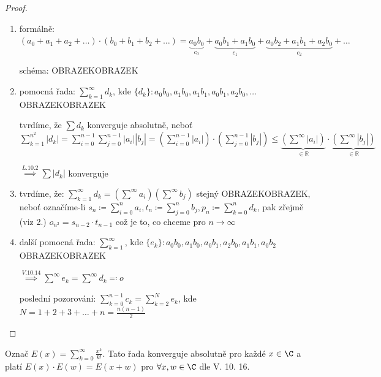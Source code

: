 \begin{proof}
   \begin{enumerate}[1.]
     \item formálně: $(a_0 + a_1 + a_2 + \dots)\cdot(b_0+b_1+b_2+\dots) = \underbrace{a_0b_0}_{c_0}+\underbrace{a_0b_1+a_1b_0}_{c_1}+\underbrace{a_0b_2+a_1b_1+a_2b_0}_{c_2}+\dots$

     schéma: OBRAZEKOBRAZEK
     \item pomocná řada: $\sum_{k=1}^{\infty} d_k$, kde $\{d_k\}: a_0b_0, a_1b_0, a_1b_1, a_0b_1, a_2b_0, \dots$ OBRAZEKOBRAZEK

     tvrdíme, že $\sum d_k$ konverguje absolutně, neboť $\sum_{k=1}^{n^2}|d_k| = \sum_{i=0}^{n-1} \sum_{j=0}^{n-1} |a_i||b_j| = \left(\sum_{i=0}^{n-1} |a_i|\right)\cdot\left(\sum_{j=0}^{n-1}|b_j|\right) \leq \underbrace{\left(\sum^{\infty} |a_i|\right)}_{\in \mathbb R}\cdot\underbrace{\left(\sum^{\infty}|b_j|\right)}_{\in \mathbb R}$

     $\stackrel{L. 10. 2}{\implies} \sum |d_k|$ konverguje
     \item tvrdíme, že: $\sum_{k=1}^{\infty} d_k = \left(\sum^{\infty} a_i\right)\left(\sum^{\infty}b_j\right)$ stejný OBRAZEKOBRAZEK, neboť označíme-li $s_n \coloneq \sum_{i=0}^{n}a_i, t_n \coloneq \sum_{j=0}^{n}b_j, p_n \coloneq \sum_{k=0}^{n}d_k$, pak zřejmě (viz 2.) $o_{n^2} = s_{n-2}\cdot t_{n-1}$ což je to, co chceme pro $n\to \infty$
     \item další pomocná řada: $\sum_{k=1}^{\infty}$, kde $\{e_k\}: a_0b_0, a_1b_0, a_0b_1, a_2b_0, a_1b_1, a_0b_2$ OBRAZEKOBRAZEK

     $\stackrel{V. 10. 14}{\implies} \sum^\infty e_k= \sum^\infty d_k \eqcolon o$

     poslední pozorování: $\sum_{k=0}^{n-1} c_k = \sum_{k=2}^N e_k$, kde $N = 1+2+3+\dots+n=\frac{n(n-1)}{2}$
   \end{enumerate}
\end{proof}

\begin{priklad}
  Označ $E(x) = \sum_{k=0}^{\infty} \frac{x^k}{k!}$. Tato řada konverguje absolutně pro každé $x \in \C$ a platí $E(x) \cdot E(w) = E(x + w)$ pro $\forall x, w \in \C$ dle V. 10. 16.
\end{priklad}
